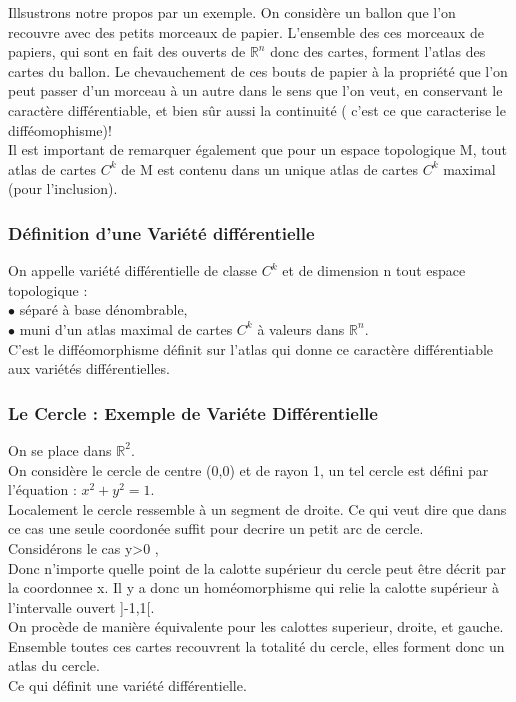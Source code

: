 \documentclass[a4paper,11pt]{article} %
\numberwithin{equation}{section} %
\numberwithin{figure}{section} %
\theoremstyle{plain} %
\theoremstyle{definition} %
\theoremstyle{remark} %
\begin{document}
\noindent
Illsustrons notre propos par un exemple. On consid\`ere un ballon que l'on recouvre avec des petits morceaux de papier. L'ensemble des ces morceaux de papiers, qui sont en fait des ouverts de $\mathbb{R}^{n}$ donc des cartes, forment l'atlas des cartes du ballon. Le chevauchement de ces bouts de  papier \`a la propri\'et\'e que l'on peut passer d'un morceau \`a un autre dans le sens que l'on veut, en conservant le caract\`ere diff\'erentiable, et bien s\^ur aussi la continuit\'e ( c'est ce que caracterise le diff\'eomophisme)!\\

\noindent
Il est important de remarquer \'egalement que pour un espace topologique M, tout atlas de cartes $C^{k}$ de M est contenu dans un unique atlas de cartes $C^{k}$ maximal (pour l'inclusion). 

\subsubsection{D\'efinition d'une Vari\'et\'e diff\'erentielle}

\noindent
On appelle vari\'et\'e diff\'erentielle de classe $C^{k}$ et de dimension n tout espace topologique :\\
$\bullet$ \hspace{0.17cm} s\'epar\'e \`a base d\'enombrable,\\
$\bullet$ \hspace{0.17cm} muni d'un atlas maximal de cartes $C^{k}$ \`a valeurs dans $\mathbb{R}^{n}$. \\

\noindent
C'est le diff\'eomorphisme d\'efinit sur l'atlas qui donne ce caract\`ere diff\'erentiable aux vari\'et\'es diff\'erentielles.

\subsubsection{Le Cercle : Exemple de Vari\'ete Diff\'erentielle}

\noindent
On se place dans $ \mathbb{R}^{2}$. \\
On consid\`ere le cercle de centre (0,0) et de rayon 1, un tel cercle est d\'efini par l'\'equation : $x^2+y^2=1$.\\
Localement le cercle ressemble \`a un segment de droite. Ce qui veut dire que dans ce cas une seule coordon\'ee suffit pour decrire un petit arc de cercle. \\
Consid\'erons le cas y>0 ,\\
Donc n'importe quelle point de la calotte sup\'erieur du cercle peut \^etre d\'ecrit par la coordonnee x. Il y a donc un hom\'eomorphisme qui relie la calotte sup\'erieur \`a l'intervalle ouvert ]-1,1[.\\
On proc\`ede de mani\`ere \'equivalente pour les calottes superieur, droite, et gauche. Ensemble toutes ces cartes recouvrent la totalit\'e du cercle, elles forment donc un atlas du cercle.\\
Ce qui d\'efinit une vari\'et\'e diff\'erentielle.
\end{document}
